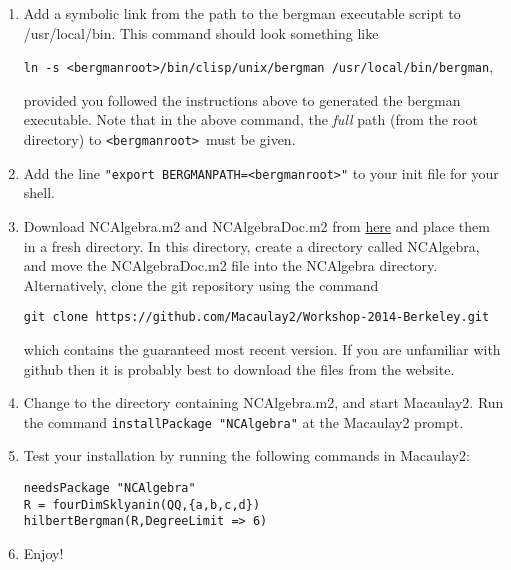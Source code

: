 \documentclass{article}
\newcommand{\bergroot}{\texttt{<bergmanroot>}}
\begin{document}
\begin{enumerate}
\begin{itemize}
\begin{center}\texttt{./mkbergman -auto}\end{center}

\item Finally, change directory to \bergroot/bin/clisp/unix.  In a text editor edit the \texttt{bergman} file there.
This is a shell script which loads the necessary files to start the bergman executable.  However, there
is a change that must be made to this file as well.  Here, \# denotes a comment.  By default
the third line is active and the second is commented.  Switch these around by uncommenting the second
line and commenting out the third line.  This ends the `special steps' required to install Bergman on a Mac.
\end{itemize}
\item \label{nextStep} Add a symbolic link from the path to the bergman executable script to /usr/local/bin.
This command should look something like

\begin{center}
\texttt{ln -s \bergroot/bin/clisp/unix/bergman /usr/local/bin/bergman},
\end{center}

provided you followed the instructions above to generated the bergman executable.  Note that in the above command,
the \emph{full} path (from the root directory) to \bergroot~must be given.
\item Add the line \texttt{"export BERGMANPATH=\bergroot"} to your init file for your shell.
\item Download NCAlgebra.m2 and NCAlgebraDoc.m2 from \href{http://users.wfu.edu/moorewf}{here} and place them in a fresh directory.  In this
directory, create a directory called NCAlgebra, and move the NCAlgebraDoc.m2 file into the NCAlgebra directory.
Alternatively, clone the git repository using the command

\begin{center}
\texttt{git clone https://github.com/Macaulay2/Workshop-2014-Berkeley.git}
\end{center}

which contains the guaranteed most recent version.  If you are unfamiliar with github then it is probably best
to download the files from the website.
\item Change to the directory containing NCAlgebra.m2, and start Macaulay2.  Run the command
\texttt{installPackage "NCAlgebra"} at the Macaulay2 prompt.
\item Test your installation by running the following commands in Macaulay2:
\begin{verbatim}
needsPackage "NCAlgebra"
R = fourDimSklyanin(QQ,{a,b,c,d})
hilbertBergman(R,DegreeLimit => 6)
\end{verbatim}
\item Enjoy!
\end{enumerate}
\end{document}
